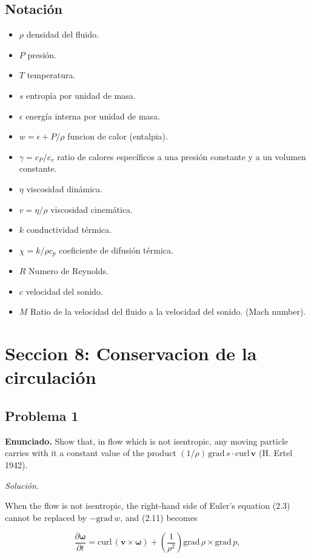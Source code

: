 \documentclass{article}
\begin{document}
\subsection*{Notación}
\begin{itemize}
    \item $\rho $ densidad del fluido.
    \item $P$ presión.
    \item $T$ temperatura.
    \item $s$ entropía por unidad de masa.
    \item $\epsilon$ energía interna por unidad de masa.
    \item $w = \epsilon + P/\rho$ funcion de calor (entalpia).
    \item $\gamma = c_{P}/c_{v}$ ratio de calores específicos a una presión constante y a un volumen constante.
    \item $\eta$ viscosidad dinámica.
    \item $v= \eta / \rho$ viscosidad cinemática.
    \item $k$ conductividad térmica.
    \item $\chi =k/\rho c_{p}$ coeficiente de difusión térmica.
    \item $R$ Numero de Reynolds.
    \item $c$ velocidad del sonido.
    \item $M$ Ratio de la velocidad del fluido a la velocidad del sonido. (Mach number).
\end{itemize}
\section*{Seccion 8: Conservacion de la circulación}
\subsection*{Problema 1}

\textbf{Enunciado.} Show that, in flow which is not isentropic, any moving particle carries with it a constant value of the product $(1/\rho) \, \text{grad} \, s \cdot \text{curl} \, \mathbf{v}$ (H. Ertel 1942).

\textit{Solución.}

When the flow is not isentropic, the right-hand side of Euler's equation (2.3) cannot be replaced by $-\text{grad} \, w$, and (2.11) becomes

$$
\frac{\partial \boldsymbol{\omega}}{\partial t} = \text{curl} \, (\mathbf{v} \times \boldsymbol{\omega}) + \left( \frac{1}{\rho^2} \right) \text{grad} \, \rho \times \text{grad} \, p,
$$
\end{document}
